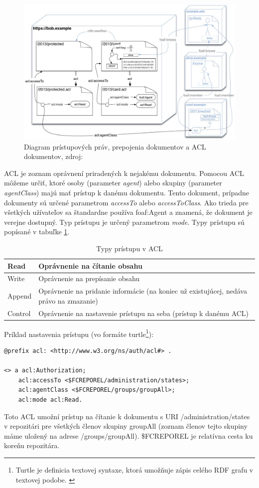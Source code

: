 \documentclass[thesis=M,slovak]{FITthesis}[2013/05/06]
\begin{document}
\begin{figure}\centering
	\includegraphics[width=1.0\textwidth]{stavy/WebACL.jpg}
 	\caption[Diagram WebACL]{Diagram prístupových práv, prepojenia dokumentov a ACL dokumentov, zdroj: \cite{WebAccessControl}}\label{graphics:WebACL}
\end{figure}

ACL je zoznam oprávnení priradených k nejakému dokumentu. Pomocou ACL môžeme určiť, ktoré osoby (parameter {\em agent}) alebo skupiny (parameter {\em agentClass}) majú mať prístup k danému dokumentu. Tento dokument, prípadne dokumenty sú určené parametrom {\em accessTo} alebo {\em accessToClass}. Ako trieda pre všetkých užívateľov sa štandardne používa foaf:Agent a znamená, že dokument je verejne dostupný.
Typ prístupu je určený parametrom {\em mode}. Typy prístupu sú popísané v tabuľke \ref{tab:modeACL}.

\begin{table}[!htbp]\centering
 	\caption[Typy prístupu v ACL]{Typy prístupu v ACL}\label{tab:modeACL}
\begin{tabularx}{\textwidth}{|l|X|} \hline
Read	        & Oprávnenie na čítanie obsahu \\ \hline
Write 	& Oprávnenie na prepísanie obsahu \\ \hline
Append	& Oprávnenie na pridanie informácie (na koniec už existujúcej, nedáva právo na zmazanie)  \\ \hline
Control	& Oprávnenie na nastavenie prístupu na seba (prístup k danému ACL) \\ \hline
\end{tabularx}
\end{table} 

Príklad nastavenia prístupu (vo formáte turtle\footnote{Turtle je definicia textovej syntaxe, ktorá umožňuje zápis celého RDF grafu v textovej podobe. \cite{RDF}\nopagebreak}):
\begin{lstlisting}[frame=single] 
@prefix acl: <http://www.w3.org/ns/auth/acl#> .

<> a acl:Authorization;
    acl:accessTo <$FCREPOREL/administration/states>;
    acl:agentClass <$FCREPOREL/groups/groupAll>;
    acl:mode acl:Read.
\end{lstlisting}
Toto ACL umožní prístup na čítanie k dokumentu s URI /administration/states v repozitári pre všetkých členov skupiny groupAll (zoznam členov tejto skupiny máme uložený na adrese /groups/groupAll). \$FCREPOREL je relatívna cesta ku koreňu repozitára.
\end{document}
